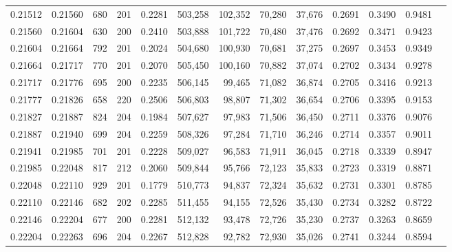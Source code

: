 \begin{tabular}{rrrrrrrrrrrrr}
0.21512 & 0.21560 &   680 & 201 &                                     0.2281 & 503,258 & 102,352 &  70,280 &  37,676 & 0.2691 & 0.3490 & 0.9481 \\
0.21560 & 0.21604 &   630 & 200 &                                     0.2410 & 503,888 & 101,722 &  70,480 &  37,476 & 0.2692 & 0.3471 & 0.9423 \\
0.21604 & 0.21664 &   792 & 201 &                                     0.2024 & 504,680 & 100,930 &  70,681 &  37,275 & 0.2697 & 0.3453 & 0.9349 \\
0.21664 & 0.21717 &   770 & 201 &                                     0.2070 & 505,450 & 100,160 &  70,882 &  37,074 & 0.2702 & 0.3434 & 0.9278 \\
0.21717 & 0.21776 &   695 & 200 &                                     0.2235 & 506,145 &  99,465 &  71,082 &  36,874 & 0.2705 & 0.3416 & 0.9213 \\
0.21777 & 0.21826 &   658 & 220 &                                     0.2506 & 506,803 &  98,807 &  71,302 &  36,654 & 0.2706 & 0.3395 & 0.9153 \\
0.21827 & 0.21887 &   824 & 204 &                                     0.1984 & 507,627 &  97,983 &  71,506 &  36,450 & 0.2711 & 0.3376 & 0.9076 \\
0.21887 & 0.21940 &   699 & 204 &                                     0.2259 & 508,326 &  97,284 &  71,710 &  36,246 & 0.2714 & 0.3357 & 0.9011 \\
0.21941 & 0.21985 &   701 & 201 &                                     0.2228 & 509,027 &  96,583 &  71,911 &  36,045 & 0.2718 & 0.3339 & 0.8947 \\
0.21985 & 0.22048 &   817 & 212 &                                     0.2060 & 509,844 &  95,766 &  72,123 &  35,833 & 0.2723 & 0.3319 & 0.8871 \\
0.22048 & 0.22110 &   929 & 201 &                                     0.1779 & 510,773 &  94,837 &  72,324 &  35,632 & 0.2731 & 0.3301 & 0.8785 \\
0.22110 & 0.22146 &   682 & 202 &                                     0.2285 & 511,455 &  94,155 &  72,526 &  35,430 & 0.2734 & 0.3282 & 0.8722 \\
0.22146 & 0.22204 &   677 & 200 &                                     0.2281 & 512,132 &  93,478 &  72,726 &  35,230 & 0.2737 & 0.3263 & 0.8659 \\
0.22204 & 0.22263 &   696 & 204 &                                     0.2267 & 512,828 &  92,782 &  72,930 &  35,026 & 0.2741 & 0.3244 & 0.8594 \\

\end{tabular}
